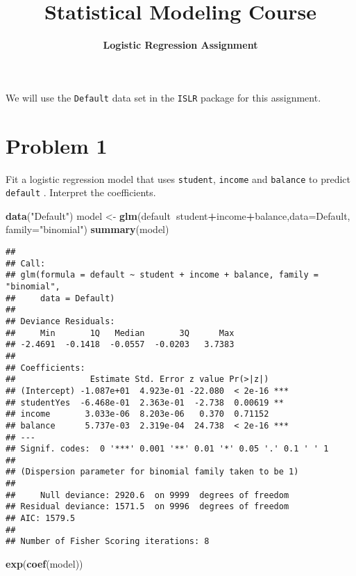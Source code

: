 \documentclass[11pt - \usepackage{enumerate},]{article}
\title{\textbf{Statistical Modeling Course}}
\subtitle{\textbf{Logistic Regression Assignment}}
\author{}
\date{}
\newenvironment{Shaded}{\begin{snugshade}}{\end{snugshade}}
\newcommand{\KeywordTok}[1]{\textcolor[rgb]{0.13,0.29,0.53}{\textbf{#1}}}
\newcommand{\DataTypeTok}[1]{\textcolor[rgb]{0.13,0.29,0.53}{#1}}
\newcommand{\StringTok}[1]{\textcolor[rgb]{0.31,0.60,0.02}{#1}}
\newcommand{\OperatorTok}[1]{\textcolor[rgb]{0.81,0.36,0.00}{\textbf{#1}}}
\newcommand{\NormalTok}[1]{#1}
\begin{document}
\maketitle

We will use the \texttt{Default} data set in the \texttt{ISLR} package
for this assignment.

\section{Problem 1}\label{problem-1}

Fit a logistic regression model that uses \texttt{student},
\texttt{income} and \texttt{balance} to predict \texttt{default} .
Interpret the coefficients.

\begin{Shaded}
\begin{Highlighting}[]
\KeywordTok{data}\NormalTok{(}\StringTok{"Default"}\NormalTok{)}
\NormalTok{model <-}\StringTok{ }\KeywordTok{glm}\NormalTok{(default}\OperatorTok{~}\NormalTok{student}\OperatorTok{+}\NormalTok{income}\OperatorTok{+}\NormalTok{balance,}\DataTypeTok{data=}\NormalTok{Default, }\DataTypeTok{family=}\StringTok{"binomial"}\NormalTok{)}
\KeywordTok{summary}\NormalTok{(model)}
\end{Highlighting}
\end{Shaded}

\begin{verbatim}
## 
## Call:
## glm(formula = default ~ student + income + balance, family = "binomial", 
##     data = Default)
## 
## Deviance Residuals: 
##     Min       1Q   Median       3Q      Max  
## -2.4691  -0.1418  -0.0557  -0.0203   3.7383  
## 
## Coefficients:
##               Estimate Std. Error z value Pr(>|z|)    
## (Intercept) -1.087e+01  4.923e-01 -22.080  < 2e-16 ***
## studentYes  -6.468e-01  2.363e-01  -2.738  0.00619 ** 
## income       3.033e-06  8.203e-06   0.370  0.71152    
## balance      5.737e-03  2.319e-04  24.738  < 2e-16 ***
## ---
## Signif. codes:  0 '***' 0.001 '**' 0.01 '*' 0.05 '.' 0.1 ' ' 1
## 
## (Dispersion parameter for binomial family taken to be 1)
## 
##     Null deviance: 2920.6  on 9999  degrees of freedom
## Residual deviance: 1571.5  on 9996  degrees of freedom
## AIC: 1579.5
## 
## Number of Fisher Scoring iterations: 8
\end{verbatim}

\begin{Shaded}
\begin{Highlighting}[]
\KeywordTok{exp}\NormalTok{(}\KeywordTok{coef}\NormalTok{(model))}
\end{Highlighting}
\end{Shaded}
\end{document}
